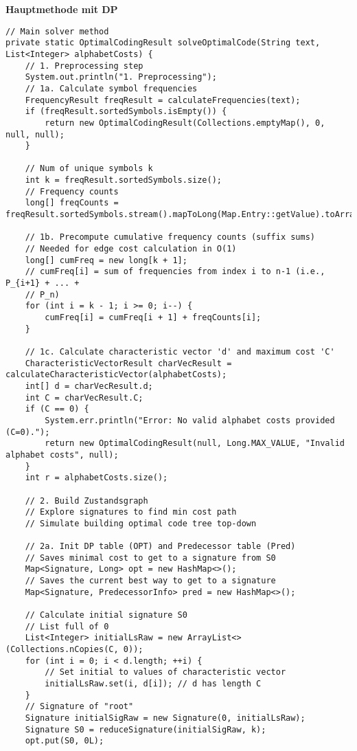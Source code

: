 \documentclass[a4paper,10pt,ngerman]{scrartcl}
\begin{document}
\textbf{Hauptmethode mit DP}
\begin{lstlisting}
// Main solver method
private static OptimalCodingResult solveOptimalCode(String text, List<Integer> alphabetCosts) {
    // 1. Preprocessing step
    System.out.println("1. Preprocessing");
    // 1a. Calculate symbol frequencies
    FrequencyResult freqResult = calculateFrequencies(text);
    if (freqResult.sortedSymbols.isEmpty()) {
        return new OptimalCodingResult(Collections.emptyMap(), 0, null, null);
    }

    // Num of unique symbols k
    int k = freqResult.sortedSymbols.size();
    // Frequency counts
    long[] freqCounts = freqResult.sortedSymbols.stream().mapToLong(Map.Entry::getValue).toArray();

    // 1b. Precompute cumulative frequency counts (suffix sums)
    // Needed for edge cost calculation in O(1)
    long[] cumFreq = new long[k + 1];
    // cumFreq[i] = sum of frequencies from index i to n-1 (i.e., P_{i+1} + ... +
    // P_n)
    for (int i = k - 1; i >= 0; i--) {
        cumFreq[i] = cumFreq[i + 1] + freqCounts[i];
    }

    // 1c. Calculate characteristic vector 'd' and maximum cost 'C'
    CharacteristicVectorResult charVecResult = calculateCharacteristicVector(alphabetCosts);
    int[] d = charVecResult.d;
    int C = charVecResult.C;
    if (C == 0) {
        System.err.println("Error: No valid alphabet costs provided (C=0).");
        return new OptimalCodingResult(null, Long.MAX_VALUE, "Invalid alphabet costs", null);
    }
    int r = alphabetCosts.size();

    // 2. Build Zustandsgraph
    // Explore signatures to find min cost path
    // Simulate building optimal code tree top-down

    // 2a. Init DP table (OPT) and Predecessor table (Pred)
    // Saves minimal cost to get to a signature from S0
    Map<Signature, Long> opt = new HashMap<>();
    // Saves the current best way to get to a signature
    Map<Signature, PredecessorInfo> pred = new HashMap<>();

    // Calculate initial signature S0
    // List full of 0
    List<Integer> initialLsRaw = new ArrayList<>(Collections.nCopies(C, 0));
    for (int i = 0; i < d.length; ++i) {
        // Set initial to values of characteristic vector
        initialLsRaw.set(i, d[i]); // d has length C
    }
    // Signature of "root"
    Signature initialSigRaw = new Signature(0, initialLsRaw);
    Signature S0 = reduceSignature(initialSigRaw, k);
    opt.put(S0, 0L);


\end{lstlisting}
\end{document}
